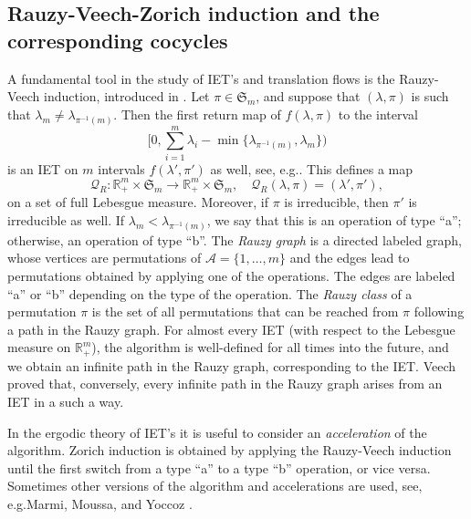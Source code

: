 \documentclass[10pt]{amsart}
\let\mathcal\mathscr
\newcommand{\sep}{:}
\theoremstyle{plain}
\theoremstyle{definition}
\let\lam\lambda
\newcommand\Frs{\mathfrak{S}}
\newcommand\Ak{\mathcal{A}}
\newcommand\Qk{\mathcal{Q}}
\newcommand{\R}{\mathbb{R}}
\providecommand{\eg}{e.g.}\providecommand{\ie}{i.e.}\providecommand{\etc}{etc.}\providecommand{\resp}{resp.}\providecommand{\cf}{cf.}
\let\Subsection\subsection\let\Subsubsection\subsubsection
\begin{document}
\Subsection{Rauzy-Veech-Zorich induction and the corresponding cocycles} \label{subsec-Rauzy}
A fundamental tool in the study of IET's and translation flows is the Rauzy-Veech induction, introduced in \cite{Veech0,Rauzy}.
Let $\pi\in \Frs_m$, and suppose that $(\lam,\pi)$ is such that $\lam_m \ne \lam_{\pi^{-1}(m)}$. Then the first return map of $f(\lam,\pi)$ to the interval
\[\textstyle
\bigl[0, \sum_{i=1}^m \lam_i - \min\{\lam_{\pi^{-1}(m)},\lam_m\} \bigr)
\]
is an IET on $m$ intervals $f(\lam',\pi')$ as well, see, \eg \cite{viana2,yoccoz}. This defines a map
\[
\Qk_R\sep \R^m_+\times \Frs_m \to \R^m_+\times \Frs_m,\quad \Qk_R(\lam,\pi) = (\lam',\pi'),
\]
on a set of full Lebesgue measure. Moreover, if $\pi$ is irreducible, then $\pi'$ is irreducible as well.
If $\lam_m < \lam_{\pi^{-1}(m)}$, we say that this is an operation of type ``a''; otherwise, an operation of type ``b''. The \emph{Rauzy graph} is a directed labeled graph, whose vertices are permutations of $\Ak=\{1,\ldots,m\}$ and the edges lead to permutations obtained by applying one of the operations. The edges are labeled ``a'' or ``b'' depending on the type of the operation. The \emph{Rauzy class} of a permutation $\pi$ is the set of all permutations that can be reached from $\pi$ following a path in the Rauzy graph. For almost every IET (with respect to the Lebesgue measure on $\R^m_+$), the algorithm is well-defined for all times into the future, and we obtain an infinite path in the Rauzy graph, corresponding to the IET. Veech \cite{veech} proved that, conversely, every infinite path in the Rauzy graph arises from an IET in a such a way.

In the ergodic theory of IET's it is useful to consider an \emph{acceleration} of the algorithm. Zorich induction \cite{Zorich,Zorich1} is obtained by applying the Rauzy-Veech induction until the first switch from a type ``a'' to a type ``b'' operation, or vice versa.
Sometimes other versions of the algorithm and accelerations are used, see, \eg Marmi, Moussa, and Yoccoz \cite{MMY}.
\end{document}

